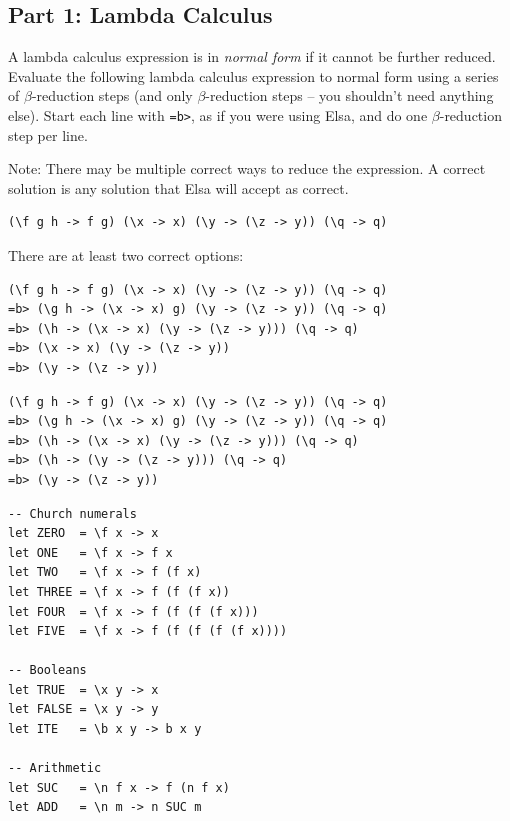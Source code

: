 \documentclass[addpoints]{exam}
\begin{document}
\begin{questions}

\subsection*{\textbf{Part 1: Lambda Calculus}}

\question[5] A lambda calculus expression is in \emph{normal form} if it cannot be further reduced.  Evaluate the following lambda calculus expression to normal form using a series of $\beta$-reduction steps (and only $\beta$-reduction steps -- you shouldn't need anything else).  Start each line with \texttt{=b>}, as if you were using Elsa, and do one $\beta$-reduction step per line.

Note: There may be multiple correct ways to reduce the expression.  A correct solution is any solution that Elsa will accept as correct.

\begin{verbatim}
(\f g h -> f g) (\x -> x) (\y -> (\z -> y)) (\q -> q)
\end{verbatim}
  \begin{solutionorbox}[3in]
There are at least two correct options:
\begin{verbatim}
(\f g h -> f g) (\x -> x) (\y -> (\z -> y)) (\q -> q)
=b> (\g h -> (\x -> x) g) (\y -> (\z -> y)) (\q -> q)
=b> (\h -> (\x -> x) (\y -> (\z -> y))) (\q -> q)
=b> (\x -> x) (\y -> (\z -> y))
=b> (\y -> (\z -> y))
\end{verbatim}

\begin{verbatim}
(\f g h -> f g) (\x -> x) (\y -> (\z -> y)) (\q -> q)
=b> (\g h -> (\x -> x) g) (\y -> (\z -> y)) (\q -> q)
=b> (\h -> (\x -> x) (\y -> (\z -> y))) (\q -> q)
=b> (\h -> (\y -> (\z -> y))) (\q -> q)
=b> (\y -> (\z -> y))
\end{verbatim}
  \end{solutionorbox}

\newpage

\begin{verbatim}
-- Church numerals
let ZERO  = \f x -> x
let ONE   = \f x -> f x
let TWO   = \f x -> f (f x)
let THREE = \f x -> f (f (f x))
let FOUR  = \f x -> f (f (f (f x)))
let FIVE  = \f x -> f (f (f (f (f x))))

-- Booleans
let TRUE  = \x y -> x
let FALSE = \x y -> y
let ITE   = \b x y -> b x y

-- Arithmetic
let SUC   = \n f x -> f (n f x)
let ADD   = \n m -> n SUC m


\end{verbatim}
\end{questions}
\end{document}
